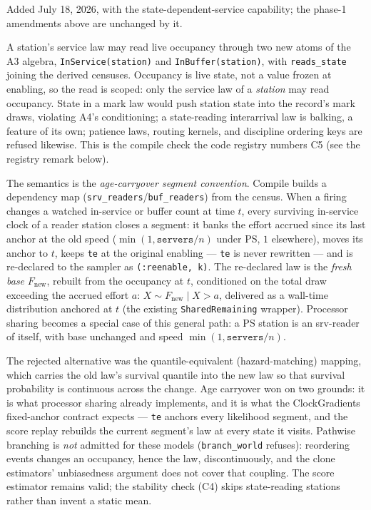 \documentclass[11pt]{article}
\newcommand{\code}[1]{\texttt{#1}}
\begin{document}
Added July 18, 2026, with the state-dependent-service capability; the
phase-1 amendments above are unchanged by it.

A station's service law may read live occupancy through two new atoms of
the A3 algebra, \code{InService(station)} and \code{InBuffer(station)},
with \code{reads\_state} joining the derived censuses. Occupancy is live
state, not a value frozen at enabling, so the read is scoped: only the
service law of a \emph{station} may read occupancy. State in a mark law
would push station state into the record's mark draws, violating A4's
conditioning; a state-reading interarrival law is balking, a feature of
its own; patience laws, routing kernels, and discipline ordering keys are
refused likewise. This is the compile check the code registry numbers C5
(see the registry remark below).

The semantics is the \emph{age-carryover segment convention}. Compile
builds a dependency map (\code{srv\_readers}/\code{buf\_readers}) from the
census. When a firing changes a watched in-service or buffer count at
time $t$, every surviving in-service clock of a reader station closes a
segment: it banks the effort accrued since its last anchor at the old
speed ($\min(1, \code{servers}/n)$ under PS, $1$ elsewhere), moves its
anchor to $t$, keeps \code{te} at the original enabling --- \code{te} is
never rewritten --- and is re-declared to the sampler as
\code{(:reenable, k)}. The re-declared law is the \emph{fresh base}
$F_{\mathrm{new}}$, rebuilt from the occupancy at $t$, conditioned on the
total draw exceeding the accrued effort $a$: $X \sim F_{\mathrm{new}}
\mid X > a$, delivered as a wall-time distribution anchored at $t$ (the
existing \code{SharedRemaining} wrapper). Processor sharing becomes a
special case of this general path: a PS station is an srv-reader of
itself, with base unchanged and speed $\min(1, \code{servers}/n)$.

The rejected alternative was the quantile-equivalent (hazard-matching)
mapping, which carries the old law's survival quantile into the new law
so that survival probability is continuous across the change. Age
carryover won on two grounds: it is what processor sharing already
implements, and it is what the ClockGradients fixed-anchor contract
expects --- \code{te} anchors every likelihood segment, and the score
replay rebuilds the current segment's law at every state it visits.
Pathwise branching is \emph{not} admitted for these models
(\code{branch\_world} refuses): reordering events changes an occupancy,
hence the law, discontinuously, and the clone estimators' unbiasedness
argument does not cover that coupling. The score estimator remains valid;
the stability check (C4) skips state-reading stations rather than invent
a static mean.
\end{document}
